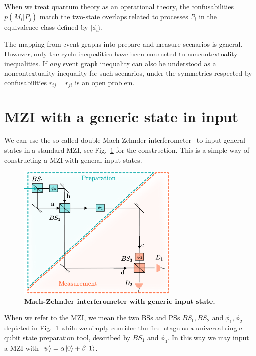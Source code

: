 \documentclass[letterpaper,onecolumn,12pt,accepted=2024-01-17]{article}
\begin{document}
When we treat quantum theory as an operational theory, the confusabilities $p(M_i \vert P_j)$ match the two-state overlaps related to processes $P_i$ in the equivalence class defined by $\vert \phi_i \rangle$. 

The mapping from event graphs into prepare-and-measure scenarios is general. However, only the cycle-inequalities have been connected to noncontextuality inequalities. If \textit{any} event graph inequality can also be understood as a noncontextuality inequality for such scenarios, under the symmetries respected by confusabilities $r_{ij} = r_{ji}$ is an open problem.



\section{MZI with a generic state in input}

We can use the so-called double Mach-Zehnder interferometer~\cite{chrysosthemos_quantum_2022} to input general states in a standard MZI, see Fig.~\ref{fig:doubleMZI} for the construction. This is a simple way of constructing a MZI with general input states. 

\begin{figure}[H]
    \centering
    \includegraphics[width=0.7\textwidth]{Acc_Figures/FinaldoubleMZI.png}
    \caption{\textbf{Mach-Zehnder interferometer with generic input state.}}
    \label{fig:doubleMZI}
\end{figure}

When we refer to the MZI, we mean the two BSs and PSs $BS_1,BS_2$ and $\phi_1,\phi_2$ depicted in Fig.~\ref{fig:doubleMZI} while we simply consider the first stage as a universal single-qubit state preparation tool, described by $BS_1$ and $\phi_0$. In this way we may input a MZI with  $\ket{\psi}=\alpha\ket{0}+\beta\ket{1}$.
\end{document}
